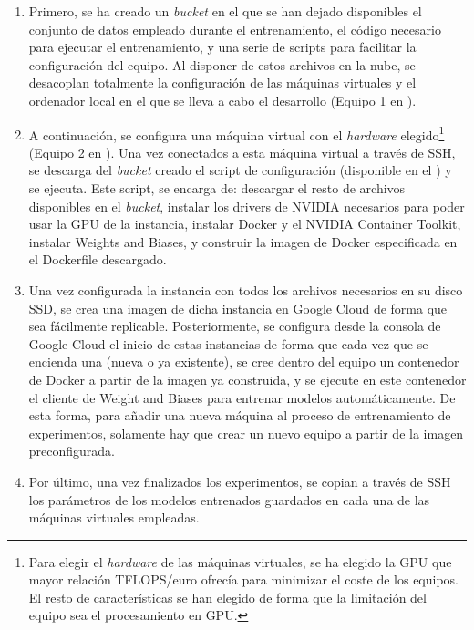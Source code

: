 \begin{enumerate}
\item Primero, se ha creado un \textit{bucket} en el que se han dejado disponibles el conjunto de datos empleado durante el entrenamiento, el código necesario para ejecutar el entrenamiento, y una serie de scripts para facilitar la configuración del equipo. Al disponer de estos archivos en la nube, se desacoplan totalmente la configuración de las máquinas virtuales y el ordenador local en el que se lleva a cabo el desarrollo (Equipo 1 en ).
\item A continuación, se configura una máquina virtual con el \textit{hardware} elegido\footnote{Para elegir el \textit{hardware} de las máquinas virtuales, se ha elegido la GPU que mayor relación TFLOPS/euro ofrecía para minimizar el coste de los equipos. El resto de características se han elegido de forma que la limitación del equipo sea el procesamiento en GPU.} (Equipo 2 en ). Una vez conectados a esta máquina virtual a través de SSH, se descarga del \textit{bucket} creado el script de configuración (disponible en el ) y se ejecuta. Este script, se encarga de: descargar el resto de archivos disponibles en el \textit{bucket}, instalar los drivers de NVIDIA necesarios para poder usar la GPU de la instancia, instalar Docker y el NVIDIA Container Toolkit, instalar Weights and Biases, y construir la imagen de Docker especificada en el Dockerfile descargado.
\item Una vez configurada la instancia con todos los archivos necesarios en su disco SSD, se crea una imagen de dicha instancia en Google Cloud de forma que sea fácilmente replicable. Posteriormente, se configura desde la consola de Google Cloud el inicio de estas instancias de forma que cada vez que se encienda una (nueva o ya existente), se cree dentro del equipo un contenedor de Docker a partir de la imagen ya construida, y se ejecute en este contenedor el cliente de Weight and Biases para entrenar modelos automáticamente. De esta forma, para añadir una nueva máquina al proceso de entrenamiento de experimentos, solamente hay que crear un nuevo equipo a partir de la imagen preconfigurada.
\item Por último, una vez finalizados los experimentos, se copian a través de SSH los parámetros de los modelos entrenados guardados en cada una de las máquinas virtuales empleadas.
\end{enumerate}

